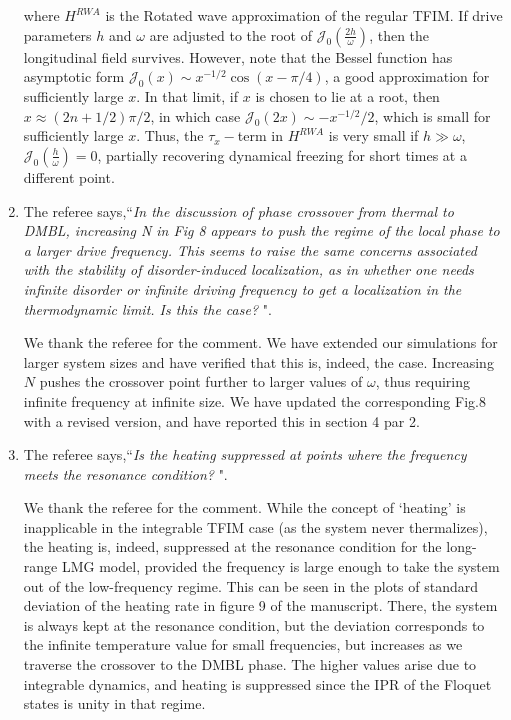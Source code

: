 \documentclass[aps,prb,reprint,showpacs,floatfix,superscriptaddress, onecolumn, nofootinbib, 9pt]{revtex4-2}
\newcommand{\response}[1]{{\color{blue}#1}} %
\begin{document}
\begin{enumerate}
{\begin{equation}
			\label{eq:tfim_sx1}
		\end{equation}
		where $H^{RWA}$ is the Rotated wave approximation of the regular TFIM. If drive parameters $h$ and $\omega$ are adjusted to the root of $\mathcal{J}_0\left(\frac{2h}{\omega}\right)$, then the longitudinal field survives. However, note that the Bessel function has asymptotic form $\mathcal{J}_0(x)\sim x^{-1/2}\cos(x-\pi/4)$, a good approximation for sufficiently  large $x$. In that limit, if $x$ is chosen to lie at a root, then $x\approx (2n+1/2)\pi/2$, in which case $\mathcal{J}_0(2x) \sim -x^{-1/2}/2$, which is small for sufficiently large $x$. Thus, the $\tau_x-$term in $H^{RWA}$ is very small if $h\gg\omega$, $\mathcal{J}_0\left(\frac{h}{\omega}\right)=0$, partially recovering dynamical freezing for short times at a different point.}

		\item The referee says,``\textit{In the discussion of phase crossover from thermal to DMBL, increasing N in Fig 8 appears to push the regime of the local phase to a larger drive frequency. This seems to raise the same concerns associated with the stability of disorder-induced localization, as in whether one needs infinite disorder or infinite driving frequency to
			get a localization in the thermodynamic limit. Is this the case? }".
		
		\response{    	
			We thank the referee for the comment. We have extended our simulations for larger system sizes and have verified that this is, indeed, the case. Increasing $N$ pushes the crossover point further to larger values of $\omega$, thus requiring infinite frequency at infinite size. We have updated the corresponding Fig.8 with a revised version, and have reported this in section 4 par 2.
		}
		\item The referee says,``\textit{Is the heating suppressed at points where the frequency meets the resonance condition? }".
		
		\response{
		We thank the referee for the comment. While the concept of `heating' is inapplicable in the integrable TFIM case (as the system never thermalizes), the heating is, indeed, suppressed at the resonance condition for the long-range LMG model, provided the frequency is large enough to take the system out of the low-frequency regime. This can be seen in the plots of standard deviation of the heating rate in figure 9 of the manuscript. There, the system is always kept at the resonance condition, but the deviation corresponds to the infinite temperature value for small frequencies, but increases as we traverse the crossover to the DMBL phase. The higher values arise due to integrable dynamics, and heating is suppressed since the IPR of the Floquet states is unity in that regime.}
		

\end{enumerate}
\end{document}

